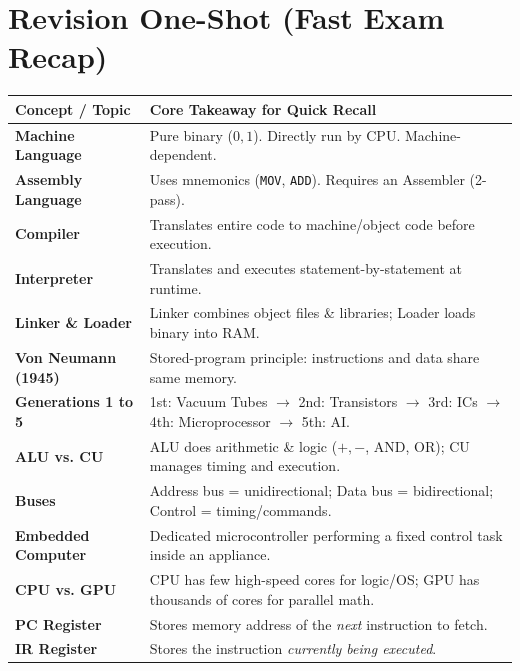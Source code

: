 \chapter*{Revision One-Shot (Fast Exam Recap)}
\label{chap:revision_oneshot}

\noindent
\begin{tcolorbox}[enhanced, colback=LightBg, colframe=CSNavy, boxrule=1pt, arc=2mm, title={\large\bfseries 5-Minute Pre-Exam Cheat Sheet}, fonttitle=\sffamily\bfseries\color{white}, colbacktitle=CSNavy]
\small\sffamily
\begin{tabular}{@{}l p{11.5cm}@{}}
\textbf{Concept / Topic} & \textbf{Core Takeaway for Quick Recall} \\
\midrule
\textbf{Machine Language} & Pure binary ($0,1$). Directly run by CPU. Machine-dependent. \\
\textbf{Assembly Language} & Uses mnemonics (\texttt{MOV}, \texttt{ADD}). Requires an Assembler (2-pass). \\
\textbf{Compiler} & Translates entire code to machine/object code before execution. \\
\textbf{Interpreter} & Translates and executes statement-by-statement at runtime. \\
\textbf{Linker \& Loader} & Linker combines object files \& libraries; Loader loads binary into RAM. \\
\midrule
\textbf{Von Neumann (1945)} & Stored-program principle: instructions and data share same memory. \\
\textbf{Generations 1 to 5} & 1st: Vacuum Tubes $\rightarrow$ 2nd: Transistors $\rightarrow$ 3rd: ICs $\rightarrow$ 4th: Microprocessor $\rightarrow$ 5th: AI. \\
\textbf{ALU vs. CU} & ALU does arithmetic \& logic ($+, -$, AND, OR); CU manages timing and execution. \\
\textbf{Buses} & Address bus = unidirectional; Data bus = bidirectional; Control = timing/commands. \\
\textbf{Embedded Computer} & Dedicated microcontroller performing a fixed control task inside an appliance. \\
\midrule
\textbf{CPU vs. GPU} & CPU has few high-speed cores for logic/OS; GPU has thousands of cores for parallel math. \\
\textbf{PC Register} & Stores memory address of the \textit{next} instruction to fetch. \\
\textbf{IR Register} & Stores the instruction \textit{currently being executed}. \\

\end{tabular}
\end{tcolorbox}
